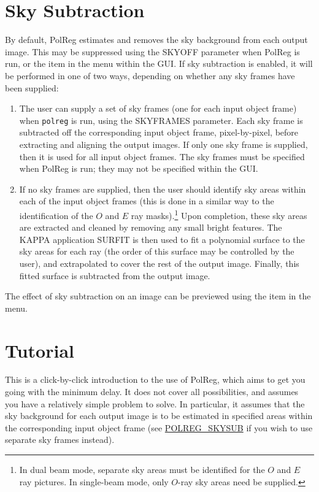 \section {Sky Subtraction}
By default, PolReg estimates and removes the sky background from each
output image. This may be suppressed using the SKYOFF parameter when
PolReg is run, or the  
item in the  menu
within the GUI. If sky subtraction is enabled, it will be performed in
one of two ways, depending on whether any sky frames have been supplied:

\begin{enumerate}

\item The user can supply a set of sky frames (one for each input object
frame) when {\tt polreg} is run, using the SKYFRAMES parameter. Each sky
frame is subtracted off the corresponding input object frame,
pixel-by-pixel, before extracting and aligning the output images. If only
one sky frame is supplied, then it is used for all input object frames.
The sky frames must be specified when PolReg is run; they may not be
specified within the GUI.

\item If no sky frames are supplied, then the user should identify sky areas
within each of the input object frames (this is done in a similar way to
the identification of the $O$ and $E$ ray masks).\footnote{In dual beam
mode, separate sky areas must be identified for the $O$ and $E$ ray
pictures. In single-beam mode, only $O$-ray sky areas need be supplied.}
Upon completion, these sky areas are extracted and cleaned by removing
any small bright features. The KAPPA application SURFIT is then used to
fit a polynomial surface to the sky areas for each ray (the
order of this surface may be controlled by the user), and
extrapolated to cover the rest of the output image. Finally, this fitted
surface is subtracted from the output image.

\end{enumerate}

The effect of sky subtraction on an image can be previewed using the
 item in the 
 menu.

\section {Tutorial}
This is a click-by-click introduction to the use of PolReg, which aims to
get you going with the minimum delay. It does not cover all possibilities,
and assumes you have a relatively simple problem to solve. In particular, 
it assumes that the sky background for each output image is to be
estimated in specified areas within the corresponding input object frame
(see \hyperref{here}{section }{}{POLREG_SKYSUB} if you wish to use
separate sky frames instead).


